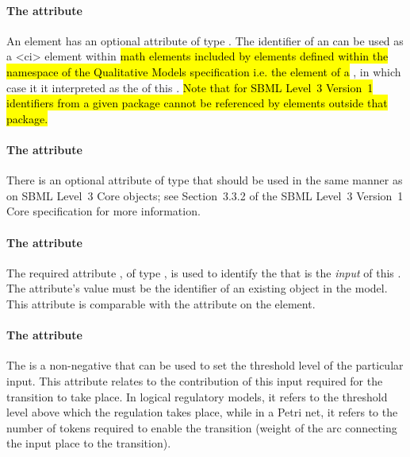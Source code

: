 \paragraph{The  attribute}
An \Input element has an optional  attribute of type . The identifier of an \Input can be used as a 
<ci> element within 
\hl{math elements included by elements defined within the namespace of the Qualitative Models specification i.e. the  element of a \FunctionTerm}, in which case it it interpreted as the  of this \Input. \hl{Note that for SBML Level~3 Version~1 identifiers from a given package cannot be referenced by elements outside that package. }

\paragraph{The  attribute}
There is an optional  attribute of type  that should be used
in the same manner as on SBML Level~3 Core
objects; see Section~3.3.2 of the SBML Level~3 Version~1 Core
specification for more information.


\paragraph{The  attribute}
The required attribute , of type , is used to identify the \QualitativeSpecies that is the \emph{input} of this \Transition.  The attribute's value must be the identifier of an existing \QualitativeSpecies object in the model.  This attribute is comparable with the  attribute on the  element.

\paragraph{The   attribute}
The  is a non-negative  that can be used to set the threshold level of the particular input. This attribute relates to the contribution of this input required for the transition to take place. In logical regulatory models, it refers to the threshold level above which the regulation takes place, while in a Petri net, it refers to the number of tokens required to enable the transition (weight of the arc connecting the input place to the transition). 

